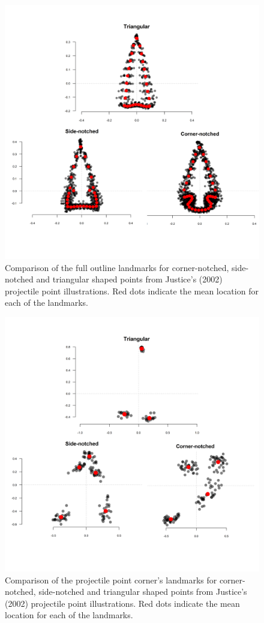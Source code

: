 \documentclass{article}
\begin{document}
\begin{figure}
\includegraphics[width=1\linewidth]{figures/curveComparison} \caption{Comparison of the full outline landmarks for corner-notched, side-notched and triangular shaped points from Justice's (2002) projectile point illustrations. Red dots indicate the mean location for each of the landmarks.}\label{fig:curvesStack}
\end{figure}

\begin{figure}
\includegraphics[width=1\linewidth]{figures/cornerComparison} \caption{Comparison of the projectile point corner's landmarks for corner-notched, side-notched and triangular shaped points from Justice's (2002) projectile point illustrations. Red dots indicate the mean location for each of the landmarks.}\label{fig:cornerComparison}
\end{figure}
\end{document}
